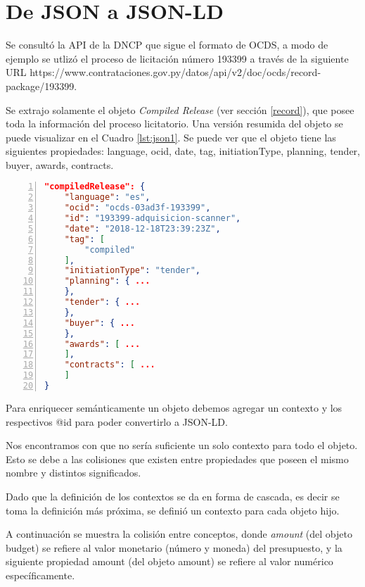 \section{De JSON a JSON-LD}


Se consultó la API de la DNCP que sigue el formato de OCDS, a modo de ejemplo se utlizó el proceso de licitación número 193399 a través de la siguiente URL https://www.contrataciones.gov.py/datos/api/v2/doc/ocds/record-package/193399.

Se extrajo solamente el objeto \textit{Compiled Release} (ver sección \ref{record}), que posee toda la información del proceso licitatorio. Una versión resumida del objeto se puede visualizar en el Cuadro \ref{lst:json1}. Se puede ver que el objeto tiene las siguientes propiedades: language, ocid, date, tag, initiationType, planning, tender, buyer, awards, contracts.\hfill \break

\noindent\begin{minipage}{\textwidth}
\begin{lstlisting}[captionpos=b, caption=Objeto JSON del OCDS de un Compiled Release, label=lst:json1,  numbers=left, language=json, numberstyle=\tiny\color{mygray},frame=single]
"compiledRelease": {
    "language": "es",
    "ocid": "ocds-03ad3f-193399",
    "id": "193399-adquisicion-scanner",
    "date": "2018-12-18T23:39:23Z",
    "tag": [
        "compiled"
    ],
    "initiationType": "tender",
    "planning": { ...
    },
    "tender": { ...
    },
    "buyer": { ...
    },
    "awards": [ ...
    ],
    "contracts": [ ...
    ]
}
\end{lstlisting}
\end{minipage}


Para enriquecer semánticamente un objeto debemos agregar un contexto y los respectivos @id para poder convertirlo a JSON-LD. 

Nos encontramos con que no sería suficiente un solo contexto para todo el objeto. Esto se debe a las colisiones que existen entre propiedades que poseen el mismo nombre y distintos significados.

Dado que la definición de los contextos se da en forma de cascada, es decir se toma la definición más próxima, se definió un contexto para cada objeto hijo.

A continuación se muestra la colisión entre conceptos, donde \textit{amount} (del objeto budget) se refiere al valor monetario (número y moneda) del presupuesto, y la siguiente propiedad amount (del objeto amount) se refiere al valor numérico específicamente.\hfill \break

